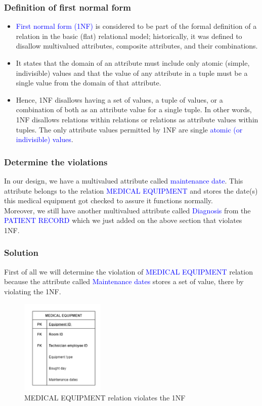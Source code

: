 \documentclass[a4paper]{article}
\numberwithin{equation}{section}
\begin{document}
\subsubsection{Definition of first normal form }
\begin{itemize}
  \item \textcolor{blue}{First normal form (1NF)} is considered to be part of the formal definition of a relation in the basic (flat) relational model; historically, it was defined to disallow multivalued attributes, composite attributes, and their combinations.
  \item It states that the domain of an attribute must include only atomic (simple, indivisible) values and that the value of any attribute in a tuple must be a single value from the domain of that attribute.
  \item Hence, 1NF disallows having a set of values, a tuple of values, or a
        combination of both as an attribute value for a single tuple. In other words, 1NF
        disallows relations within relations or relations as attribute values within tuples. The
        only attribute values permitted by 1NF are single \textcolor{blue}{atomic (or indivisible) values}.
\end{itemize}

\subsubsection{Determine the violations}
In our design, we have a multivalued attribute called \textcolor{blue}{maintenance date}. This attribute belongs to the relation \textcolor{blue}{MEDICAL EQUIPMENT} and stores the date(s) this medical equipment got checked to assure it functions normally. \\
Moreover, we still have another multivalued attribute called \textcolor{blue}{Diagnosis} from the \textcolor{blue}{PATIENT RECORD} which we just added on the above section that violates 1NF\@.


\subsubsection{Solution}
First of all we will determine the violation of \textcolor{blue}{MEDICAL EQUIPMENT} relation because the attribute called \textcolor{blue}{Maintenance dates} stores a set of value, there by violating the 1NF\@.
\begin{figure}[H]
  \centering
  \includegraphics[width = 4cm ]{assets/1NFviolation.PNG}
  \caption{MEDICAL EQUIPMENT relation violates the 1NF }
\end{figure}
\end{document}
